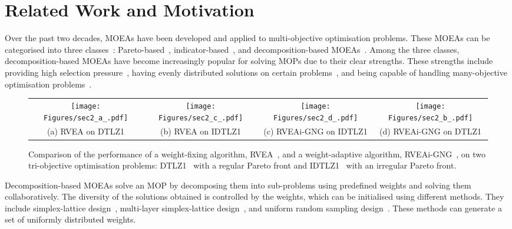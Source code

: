 \section{Related Work and Motivation}
Over the past two decades, MOEAs have been developed and applied to multi-objective optimisation problems. 
These MOEAs can be categorised into three classes~\cite{Zhou2011,LiB2015}: Pareto-based~\cite{Deb2002}, indicator-based~\cite{Zitzler2004}, and decomposition-based MOEAs~\cite{Zhang2007}. Among the three classes, decomposition-based MOEAs have become increasingly popular for solving MOPs due to their clear strengths. These strengths include providing high selection pressure~\cite{LiK2014}, having evenly distributed solutions on certain problems~\cite{LiK2015}, and being capable of handling many-objective optimisation problems~\cite{Asafuddoula2015b, LiK2015, Yuan2015b}. 
\begin{figure*}[tbp]
	\begin{center}
        \begin{tabular}{@{}c@{}c@{}c@{}c@{}}			
			\texttt{[image: Figures/sec2\_a\_.pdf]}&
			\texttt{[image: Figures/sec2\_c\_.pdf]}&
			\texttt{[image: Figures/sec2\_d\_.pdf]}&
			\texttt{[image: Figures/sec2\_b\_.pdf]}\\
			(a) RVEA on DTLZ1 & (b) RVEA on IDTLZ1 & (c) RVEAi-GNG on IDTLZ1 & (d) RVEAi-GNG on DTLZ1 \\
		\end{tabular}
	\end{center}
	\caption{Comparison of the performance of a weight-fixing algorithm, RVEA~\cite{Cheng2016}, and a weight-adaptive algorithm, RVEAi-GNG~\cite{Liu2020}, on two tri-objective optimisation problems: DTLZ1~\cite{Deb2005a} with a regular Pareto front and IDTLZ1~\cite{Deb2014} with an irregular Pareto front.}
	\label{fig:sec2}
\end{figure*}

Decomposition-based MOEAs solve an MOP by decomposing them into sub-problems using predefined weights and solving them collaboratively. The diversity of the solutions obtained is controlled by the weights, which can be initialised using different methods. They include simplex-lattice design~\cite{Das1998}, multi-layer simplex-lattice design~\cite{Deb2014, Jiang2017, Tan2013}, and uniform random sampling design~\cite{Ma2014}. These methods can generate a set of uniformly distributed weights.

